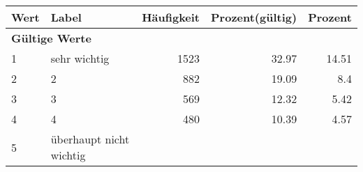      \begin{longtable}{lXrrr}
     \toprule
     \textbf{Wert} & \textbf{Label} & \textbf{Häufigkeit} & \textbf{Prozent(gültig)} & \textbf{Prozent} \\
     \endhead
     \midrule
     \multicolumn{5}{l}{\textbf{Gültige Werte}}\\

     1 &
     \multicolumn{1}{X}{ sehr wichtig   } &


       \num{1523} &
       \num[round-mode=places,round-precision=2]{32.97} &
         \num[round-mode=places,round-precision=2]{14.51} \\

     2 &
     \multicolumn{1}{X}{ 2   } &


       \num{882} &
       \num[round-mode=places,round-precision=2]{19.09} &
         \num[round-mode=places,round-precision=2]{8.4} \\

     3 &
     \multicolumn{1}{X}{ 3   } &


       \num{569} &
       \num[round-mode=places,round-precision=2]{12.32} &
         \num[round-mode=places,round-precision=2]{5.42} \\

     4 &
     \multicolumn{1}{X}{ 4   } &


       \num{480} &
       \num[round-mode=places,round-precision=2]{10.39} &
         \num[round-mode=places,round-precision=2]{4.57} \\

     5 &
     \multicolumn{1}{X}{ überhaupt nicht wichtig   } &



\end{longtable}
